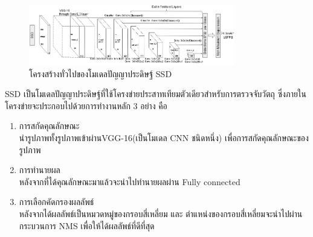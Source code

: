 \begin{figure}[!ht]
	\centering
	\includegraphics[width=0.8\textwidth]{chapter2/images/vgg.jpg}
		\caption{โครงสร้างทั่วไปของโมเดลปัญญาประดิษฐ์ SSD}
    	\label{fig:ssd}
\end{figure}

SSD เป็นโมเดลปัญญาประดิษฐ์ที่ใช้โครงข่ายประสาทเทียมตัวเดียวสำหรับการตรวจจับวัตถุ ซึ่งภายในโครงข่ายจะประกอบไปด้วยการทำงานหลัก 3 อย่าง คือ
\begin{enumerate}
	\setlength\itemsep{-0.25em}
	\item การสกัดคุณลักษณะ
	\\	นำรูปภาพทั้งรูปภาพเข้าผ่านVGG-16(เป็นโมเดล CNN ชนิดหนึ่ง) เพื่อการสกัดคุณลักษณะของรูปภาพ
	\item การทำนายผล
	\\	หลังจากที่ได้คุณลักษณะมาแล้วจะนำไปทำนายผลผ่าน Fully connected
	\item การเลือกคัดกรองผลลัพธ์
	\\	หลังจากได้ผลลัพธ์เป็นหมวดหมู่ของกรอบสี่เหลี่ยม และ ตำแหน่งของกรอบสี่เหลี่ยมจะนำไปผ่านกระบวนการ NMS เพื่อให้ได้ผลลัพธ์ที่ดีที่สุด  
\end{enumerate}


